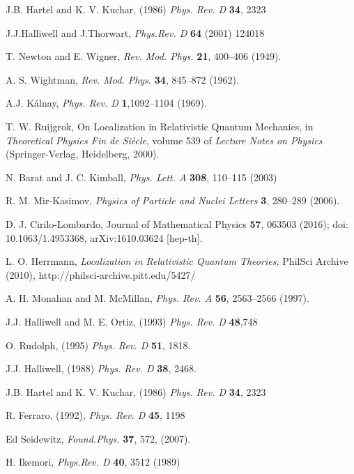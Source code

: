 \documentclass[12pt]{article}
\begin{document}
\begin{thebibliography}{000}
   J.B. Hartel and K. V. Kuchar, (1986) \textit{Phys. Rev. D} \textbf{34}, 2323
  
  J.J.Halliwell and J.Thorwart, \textit{Phys.Rev. D} \textbf{64} (2001) 124018
  
  T. Newton and E. Wigner, 
{\it Rev. Mod. Phys.} {\bf 21}, 400--406 (1949).
  
  A. S. Wightman,  {\it Rev. Mod. Phys.}
{\bf 34}, 845--872 (1962).

  A.J. K\'alnay, 
{\it Phys. Rev. D} {\bf 1},1092--1104 (1969).
 
  T. W. Ruijgrok, On Localization in Relativistic Quantum Mechanics,
in {\it Theoretical Physics Fin de Si\`ecle},
volume 539 of {\it Lecture Notes on Physics} (Springer-Verlag, Heidelberg, 2000).
 
   N. Barat and J. C. Kimball, 
{\it Phys. Lett. A} {\bf 308}, 110--115 (2003)
 
  R. M. Mir-Kasimov, {\it Physics of Particle and Nuclei Letters}
{\bf 3}, 280--289 (2006).
 
  D. J. Cirilo-Lombardo,  Journal of Mathematical Physics {\bf 57}, 063503 (2016); doi: 10.1063/1.4953368,
arXiv:1610.03624 [hep-th].
 
  L. O. Herrmann,  \textit{Localization in Relativistic Quantum Theories,}  PhilSci Archive (2010),
http://philsci-archive.pitt.edu/5427/
 
  A. H. Monahan and M. McMillan, {\it Phys. Rev. A} {\bf 56}, 2563--2566 (1997).

 
 
  
  J.J. Halliwell and M. E. Ortiz, (1993) \textit{Phys. Rev. D} \textbf{48},748
  
 O. Rudolph,  (1995) \textit{Phys. Rev. D} \textbf{51}, 1818.
 
  
  
  J.J. Halliwell, (1988) \textit{Phys. Rev. D} \textbf{38}, 2468.
 
  
   J.B. Hartel and K. V. Kuchar, (1986) \textit{Phys. Rev. D} \textbf{34}, 2323

   R. Ferraro, (1992), \textit{Phys. Rev. D} \textbf{45}, 1198
   
  Ed Seidewitz, \textit{Found.Phys.} \textbf{37}, 572, (2007).
 
  H. Ikemori,  \textit{Phys.Rev. D} \textbf{40},  3512 (1989)
  

\end{thebibliography}
\end{document}
